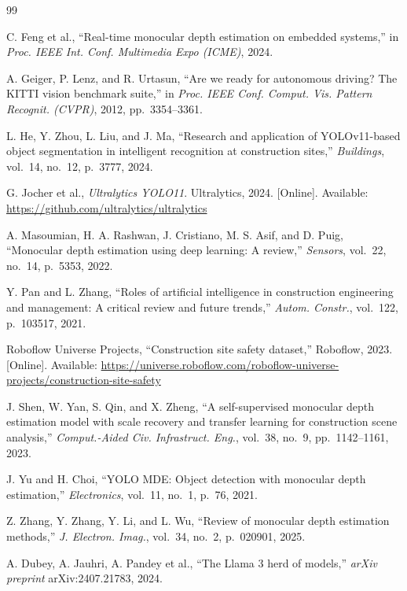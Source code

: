 \documentclass{article}
\begin{document}
\begin{thebibliography}{99}

C. Feng et al., ``Real-time monocular depth estimation on embedded systems,'' in \textit{Proc. IEEE Int. Conf. Multimedia Expo (ICME)}, 2024.

A. Geiger, P. Lenz, and R. Urtasun, ``Are we ready for autonomous driving? The KITTI vision benchmark suite,'' in \textit{Proc. IEEE Conf. Comput. Vis. Pattern Recognit. (CVPR)}, 2012, pp.~3354--3361.

L. He, Y. Zhou, L. Liu, and J. Ma, ``Research and application of YOLOv11-based object segmentation in intelligent recognition at construction sites,'' \textit{Buildings}, vol.~14, no.~12, p.~3777, 2024.

G. Jocher et al., \textit{Ultralytics YOLO11}. Ultralytics, 2024. [Online]. Available: \url{https://github.com/ultralytics/ultralytics}

A. Masoumian, H. A. Rashwan, J. Cristiano, M. S. Asif, and D. Puig, ``Monocular depth estimation using deep learning: A review,'' \textit{Sensors}, vol.~22, no.~14, p.~5353, 2022.

Y. Pan and L. Zhang, ``Roles of artificial intelligence in construction engineering and management: A critical review and future trends,'' \textit{Autom. Constr.}, vol.~122, p.~103517, 2021.

Roboflow Universe Projects, ``Construction site safety dataset,'' Roboflow, 2023. [Online]. Available: \url{https://universe.roboflow.com/roboflow-universe-projects/construction-site-safety}

J. Shen, W. Yan, S. Qin, and X. Zheng, ``A self-supervised monocular depth estimation model with scale recovery and transfer learning for construction scene analysis,'' \textit{Comput.-Aided Civ. Infrastruct. Eng.}, vol.~38, no.~9, pp.~1142--1161, 2023.

J. Yu and H. Choi, ``YOLO MDE: Object detection with monocular depth estimation,'' \textit{Electronics}, vol.~11, no.~1, p.~76, 2021.

Z. Zhang, Y. Zhang, Y. Li, and L. Wu, ``Review of monocular depth estimation methods,'' \textit{J. Electron. Imag.}, vol.~34, no.~2, p.~020901, 2025.

A. Dubey, A. Jauhri, A. Pandey et al., ``The Llama 3 herd of models,'' \textit{arXiv preprint} arXiv:2407.21783, 2024.


\end{thebibliography}
\end{document}
